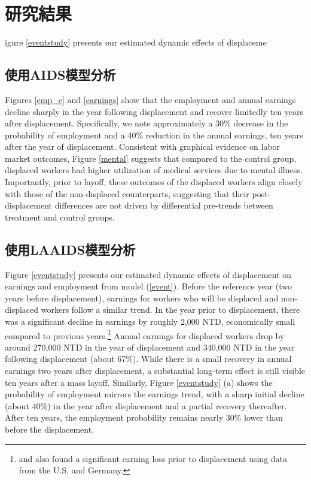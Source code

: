 \section{研究結果}\label{dis_labor_health}

igure \ref{eventstudy} presents our estimated dynamic effects of displaceme

\subsection{使用AIDS模型分析}
Figures \ref{emp_e} and \ref{earnings} show that the employment and annual earnings decline sharply in the year following displacement and recover limitedly ten years after displacement. Specifically, we note approximately a 30\% decrease in the probability of employment and a 40\% reduction in the annual earnings, ten years after the year of displacement. Consistent with graphical evidence on labor market outcomes, Figure \ref{mental} suggests that compared to the control group, displaced workers had higher utilization of medical services due to mental illness. Importantly, prior to layoff, these outcomes of the displaced workers align closely with those of the non-displaced counterparts, suggesting that their post-displacement differences are not driven by differential pre-trends between treatment and control groups. 

\subsection{使用LAAIDS模型分析}\label{dis_labor}

Figure \ref{eventstudy} presents our estimated dynamic effects of displacement on earnings and employment from model (\ref{event}). Before the reference year (two years before displacement), earnings for workers who will be displaced and non-displaced workers follow a similar trend. In the year prior to displacement, there was a significant decline in earnings by roughly 2,000 NTD, economically small compared to previous years.\footnote{\citet{lachowska} and \citet{schmieder} also found a significant earning loss prior to displacement using data from the U.S. and Germany.} Annual earnings for displaced workers drop by around 270,000 NTD in the year of displacement and 340,000 NTD in the year following displacement (about 67\%). While there is a small recovery in annual earnings two years after displacement, a substantial long-term effect is still visible ten years after a mass layoff. Similarly, Figure \ref{eventstudy} (a) shows the probability of employment mirrors the earnings trend, with a sharp initial decline (about 40\%) in the year after displacement and a partial recovery thereafter. After ten years, the employment probability remains nearly 30\% lower than before the displacement. 
